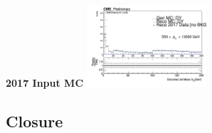 \documentclass{beamer}
\begin{document}
\begin{frame}{\textbf{2017 Input MC}}
\includegraphics[width=0.3333\textwidth]{Jun25_unfoldPlots_sdB0/InputlocalrecobinnedMC_mass_Ptbin550to13000_Detbinning_Groomingis_sdB0.png}
%


\end{frame}




\subsection{Closure}
\end{document}
